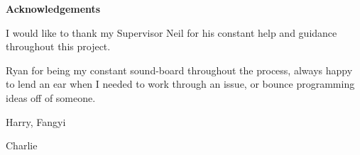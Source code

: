 \thispagestyle{empty}

\begin{center}
    {\LARGE\bf Acknowledgements}
\end{center}

I would like to thank my Supervisor Neil for his constant help and guidance throughout this project.

Ryan for being my constant sound-board throughout the process, always happy to lend an ear when I needed to work through an issue, or bounce programming ideas off of someone.

Harry, Fangyi

Charlie
